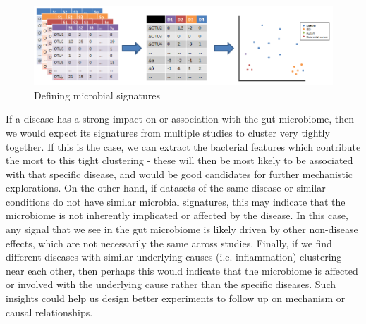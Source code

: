 \documentclass[12pt]{article}
\begin{document}
\begin{figure}
\begin{center}
\includegraphics[scale=0.5]{microbial_signatures}
\caption{Defining microbial signatures}\label{fig:microbe_signatures}
\end{center}
\end{figure}


If a disease has a strong impact on or association with the gut 
microbiome, then we would expect its signatures from multiple studies 
to cluster very tightly together. If this is the case, we can extract 
the bacterial features which contribute the most to this tight 
clustering - these will then be most likely to be associated with that 
specific disease, and would be good candidates for further mechanistic 
explorations. On the other hand, if datasets of the same disease or 
similar conditions do not have similar microbial signatures, this may 
indicate that the microbiome is not inherently implicated or affected 
by the disease. In this case, any signal that we see in the gut 
microbiome is likely driven by other non-disease effects, which are 
not necessarily the same across studies. Finally, if we find different 
diseases with similar underlying causes (i.e. inflammation) clustering 
near each other, then perhaps this would indicate that the microbiome 
is affected or involved with the underlying cause rather than the 
specific diseases. Such insights could help us design better 
experiments to follow up on mechanism or causal relationships.
\end{document}

